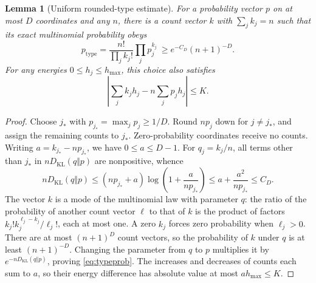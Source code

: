 \documentclass[11pt,a4paper]{article}
\newtheorem{lemma}[theorem]{Lemma}
\theoremstyle{remark}
\newcommand{\KL}{D_{\mathrm{KL}}}
\begin{document}
\begin{lemma}[Uniform rounded-type estimate]\label{lem:type}
For a probability vector \(p\) on at most \(D\) coordinates and any \(n\),
there is a count vector \(k\) with \(\sum_jk_j=n\) such that its exact
multinomial probability obeys
\begin{equation}\label{eq:typeprob}
 p_{\mathrm{type}}=\frac{n!}{\prod_jk_j!}\prod_jp_j^{k_j}
 \ \geq e^{-C_D}(n+1)^{-D}.
\end{equation}
For any energies \(0\leq h_j\leq h_{\max}\), this choice also satisfies
\[
 \left|\sum_jk_jh_j-n\sum_jp_jh_j\right|\leq K.
\]
\end{lemma}
\begin{proof}
Choose \(j_*\) with \(p_{j_*}=\max_jp_j\geq1/D\).
Round \(np_j\) down for \(j\ne j_*\), and assign the remaining counts to
\(j_*\). Zero-probability coordinates receive no counts.
Writing \(a=k_{j_*}-np_{j_*}\), we have \(0\leq a\leq D-1\).
For \(q_j=k_j/n\), all terms other than \(j_*\) in
\(n\KL(q\Vert p)\) are nonpositive, whence
\[
 n\KL(q\Vert p)
 \leq (np_{j_*}+a)\log\left(1+\frac a{np_{j_*}}\right)
 \leq a+\frac{a^2}{np_{j_*}}\leq C_D.
\]
The vector \(k\) is a mode of the multinomial law with parameter \(q\):
the ratio of the probability of another count vector \(\ell\) to that of
\(k\) is the product of factors
\(k_j!k_j^{\ell_j-k_j}/\ell_j!\), each at most one. A zero \(k_j\)
forces zero probability when \(\ell_j>0\).
There are at most \((n+1)^D\) count vectors, so the probability of \(k\)
under \(q\) is at least \((n+1)^{-D}\). Changing the parameter from \(q\)
to \(p\) multiplies it by \(e^{-n\KL(q\Vert p)}\), proving
\eqref{eq:typeprob}. The increases and decreases of counts each sum to
\(a\), so their energy difference has absolute value at most
\(ah_{\max}\leq K\).
\end{proof}
\end{document}
